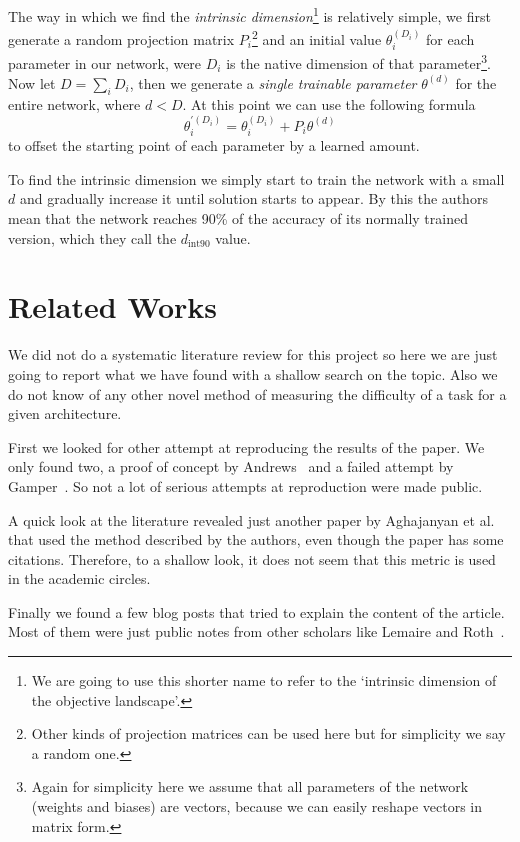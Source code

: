 \documentclass[twocolumn]{article}
\begin{document}
The way in which we find the \emph{intrinsic dimension}\footnote{We are going to
use this shorter name to refer to the `intrinsic dimension of the objective
landscape'.} is relatively simple, we first generate a random projection matrix
$P_i$\footnote{Other kinds of projection matrices can be used here but for
simplicity we say a random one.} and an initial value $\theta_i^{(D_i)}$ for
each parameter in our network, were $D_i$ is the native dimension of that
parameter\footnote{Again for simplicity here we assume that all parameters of
the network (weights and biases) are vectors, because we can easily reshape
vectors in matrix form.}. Now let $D = \sum_i D_i$, then we generate a
\emph{single trainable parameter} $\theta^{(d)}$ for the entire network, where
$d<D$. At this point we can use the following formula
%
\begin{displaymath}
	\theta_i^{'(D_i)} =\theta_i^{(D_i)} + P_i \theta^{(d)}
\end{displaymath}
%
to offset the starting point of each parameter by a learned amount.

To find the intrinsic dimension we simply start to train the network with a
small $d$ and gradually increase it until solution starts to appear. By this the
authors mean that the network reaches 90\% of the accuracy of its normally
trained version, which they call the $d_{\mathrm{int}90}$ value.

\section{Related Works}
We did not do a systematic literature review for this project so here we are
just going to report what we have found with a shallow search on the topic. Also
we do not know of any other novel method of measuring the difficulty of a task
for a given architecture.

First we looked for other attempt at reproducing the results of the paper. We
only found two, a proof of concept by Andrews~\cite{mdda} and a failed attempt
by Gamper~\cite{jgamper}. So not a lot of serious attempts at reproduction were
made public.

A quick look at the literature revealed just another paper by Aghajanyan et
al.~\cite{aghajanyan-etal-2021-intrinsic} that used the method described by the
authors, even though the paper has some citations. Therefore, to a shallow look,
it does not seem that this metric is used in the academic circles.

Finally we found a few blog posts that tried to explain the content of the
article. Most of them were just public notes from other scholars like Lemaire
and Roth~\cite{blog1, blog2}.
\end{document}
